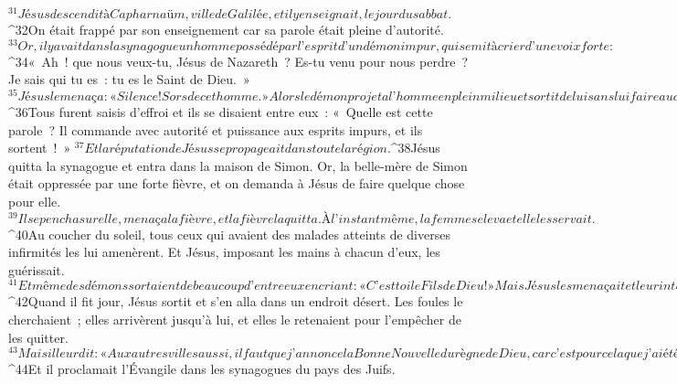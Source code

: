 ${}^{31}Jésus descendit à Capharnaüm, ville de Galilée, et il y enseignait, le jour du sabbat. 
${}^{32}On était frappé par son enseignement car sa parole était pleine d’autorité.
${}^{33}Or, il y avait dans la synagogue un homme possédé par l’esprit d’un démon impur, qui se mit à crier d’une voix forte : 
${}^{34}« Ah ! que nous veux-tu, Jésus de Nazareth ? Es-tu venu pour nous perdre ? Je sais qui tu es : tu es le Saint de Dieu. » 
${}^{35}Jésus le menaça : « Silence ! Sors de cet homme. » Alors le démon projeta l’homme en plein milieu et sortit de lui sans lui faire aucun mal. 
${}^{36}Tous furent saisis d’effroi et ils se disaient entre eux : « Quelle est cette parole ? Il commande avec autorité et puissance aux esprits impurs, et ils sortent ! » 
${}^{37}Et la réputation de Jésus se propageait dans toute la région.
${}^{38}Jésus quitta la synagogue et entra dans la maison de Simon. Or, la belle-mère de Simon était oppressée par une forte fièvre, et on demanda à Jésus de faire quelque chose pour elle. 
${}^{39}Il se pencha sur elle, menaça la fièvre, et la fièvre la quitta. À l’instant même, la femme se leva et elle les servait.
${}^{40}Au coucher du soleil, tous ceux qui avaient des malades atteints de diverses infirmités les lui amenèrent. Et Jésus, imposant les mains à chacun d’eux, les guérissait. 
${}^{41}Et même des démons sortaient de beaucoup d’entre eux en criant : « C’est toi le Fils de Dieu ! » Mais Jésus les menaçait et leur interdisait de parler, parce qu’ils savaient, eux, que le Christ, c’était lui.
${}^{42}Quand il fit jour, Jésus sortit et s’en alla dans un endroit désert. Les foules le cherchaient ; elles arrivèrent jusqu’à lui, et elles le retenaient pour l’empêcher de les quitter. 
${}^{43}Mais il leur dit : « Aux autres villes aussi, il faut que j’annonce la Bonne Nouvelle du règne de Dieu, car c’est pour cela que j’ai été envoyé. » 
${}^{44}Et il proclamait l’Évangile dans les synagogues du pays des Juifs.
      
